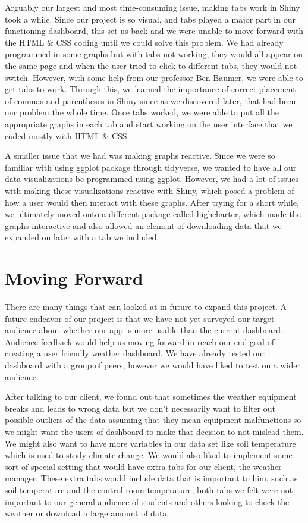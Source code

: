 \documentclass[10pt,letterpaper]{article}
\begin{document}
Arguably our largest and most time-consuming issue, making tabs work in
Shiny took a while. Since our project is so visual, and tabs played a
major part in our functioning dashboard, this set us back and we were
unable to move forward with the HTML \& CSS coding until we could solve
this problem. We had already programmed in some graphs but with tabs not
working, they would all appear on the same page and when the user tried
to click to different tabs, they would not switch. However, with some
help from our professor Ben Baumer, we were able to get tabs to work.
Through this, we learned the importance of correct placement of commas
and parentheses in Shiny since as we discovered later, that had been our
problem the whole time. Once tabs worked, we were able to put all the
appropriate graphs in each tab and start working on the user interface
that we coded mostly with HTML \& CSS.

A smaller issue that we had was making graphs reactive. Since we were so
familiar with using ggplot package through tidyverse, we wanted to have
all our data visualizations be programmed using ggplot. However, we had
a lot of issues with making these visualizations reactive with Shiny,
which posed a problem of how a user would then interact with these
graphs. After trying for a short while, we ultimately moved onto a
different package called highcharter, which made the graphs interactive
and also allowed an element of downloading data that we expanded on
later with a tab we included.

\section{Moving Forward}\label{moving-forward}

There are many things that can looked at in future to expand this
project. A future endeavor of our project is that we have not yet
surveyed our target audience about whether our app is more usable than
the current dashboard. Audience feedback would help us moving forward in
reach our end goal of creating a user friendly weather dashboard. We
have already tested our dashboard with a group of peers, however we
would have liked to test on a wider audience.

After talking to our client, we found out that sometimes the weather
equipment breaks and leads to wrong data but we don't necessarily want
to filter out possible outliers of the data assuming that they mean
equipment malfunctions so we might want the users of dashboard to make
that decision to not mislead them. We might also want to have more
variables in our data set like soil temperature which is used to study
climate change. We would also liked to implement some sort of special
setting that would have extra tabs for our client, the weather manager.
These extra tabs would include data that is important to him, such as
soil temperature and the control room temperature, both tabs we felt
were not important to our general audience of students and others
looking to check the weather or download a large amount of data.
\end{document}
